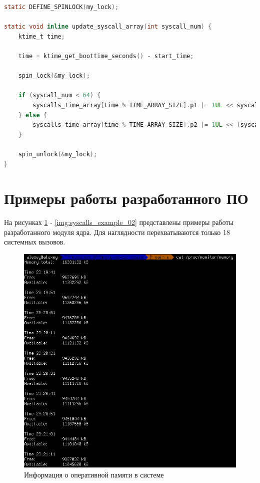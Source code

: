 \begin{lstlisting}[label=lst:update_syscall_array, caption=Реализация функции \texttt{update\_syscall\_array()}, language=c]
static DEFINE_SPINLOCK(my_lock);

static void inline update_syscall_array(int syscall_num) {
	ktime_t time;
	
	time = ktime_get_boottime_seconds() - start_time;
	
	spin_lock(&my_lock);
	
	if (syscall_num < 64) {
		syscalls_time_array[time % TIME_ARRAY_SIZE].p1 |= 1UL << syscall_num;
	} else {
		syscalls_time_array[time % TIME_ARRAY_SIZE].p2 |= 1UL << (syscall_num % 64);
	}
	
	spin_unlock(&my_lock);
}
\end{lstlisting}

\section{Примеры работы разработанного ПО}

На рисунках \ref{img:memory_example} - \ref{img:syscalls_example_02} представлены примеры работы разработанного модуля ядра. Для наглядности перехватываются только 18 системных вызовов.

\begin{figure}[h!]
	\begin{center}
		\includegraphics[scale=0.6]{img/memory_example.png}
	\end{center}
	\captionsetup{justification=centering}
	\caption{Информация о оперативной памяти в системе}
	\label{img:memory_example}
\end{figure}

